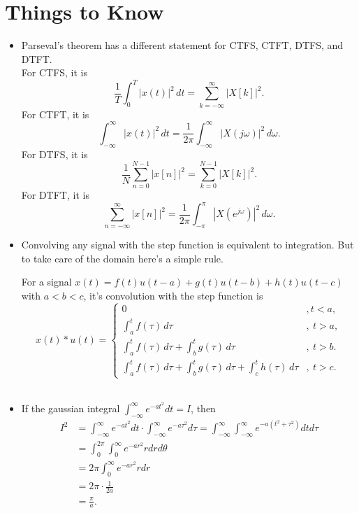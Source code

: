 \documentclass[a4paper]{article}
\begin{document}
\section*{Things to Know}

\begin{itemize}
\item Parseval's theorem has a different statement for CTFS, CTFT, DTFS, and DTFT.\\
For CTFS, it is
\begin{equation*}
    \frac{1}{T} \int_{0}^{T} |x(t)|^2\,dt = \sum_{k=-\infty}^{\infty} |X[k]|^2.
\end{equation*}
For CTFT, it is
\begin{equation*}
    \int_{-\infty}^{\infty} |x(t)|^2\,dt = \frac{1}{2\pi} \int_{-\infty}^{\infty} |X(j\omega)|^2\,d\omega.
\end{equation*}
For DTFS, it is
\begin{equation*}
    \frac{1}{N} \sum_{n=0}^{N-1} |x[n]|^2 = \sum_{k=0}^{N-1} |X[k]|^2.
\end{equation*}
For DTFT, it is
\begin{equation*}
    \sum_{n=-\infty}^{\infty} |x[n]|^2 = \frac{1}{2\pi} \int_{-\pi}^{\pi} |X(e^{j\omega})|^2\,d\omega.
\end{equation*}

\item Convolving any signal with the step function is equivalent to integration. But to take care of the domain here's a simple rule.
\vspace{5pt}

\noindent
For a signal $x(t) = f(t)u(t-a) + g(t)u(t-b) + h(t)u(t-c)$ with $a < b < c$, it's convolution with the step function is
\begin{equation*}
    x(t) * u(t) = 
    \begin{cases}
        0 &, t < a, \\[5pt]
        \int_{a}^{t} f(\tau)\,d\tau &,\ t > a, \\[5pt]
        \int_{a}^{t} f(\tau)\,d\tau + \int_{b}^{t} g(\tau)\,d\tau &,\ t > b. \\[5pt]
        \int_{a}^{t} f(\tau)\,d\tau + \int_{b}^{t} g(\tau)\,d\tau + \int_{c}^{t} h(\tau)\,d\tau &,\ t > c.
    \end{cases}
\end{equation*} \\

\item If the gaussian integral $\int_{-\infty}^{\infty} e^{-at^2} dt = I$, then
\begin{align*}
    I^2 &= \int_{-\infty}^{\infty} e^{-at^2} dt \cdot \int_{-\infty}^{\infty} e^{-a\tau^2} d\tau = \int_{-\infty}^{\infty} \int_{-\infty}^{\infty} e^{-a(t^2 + \tau^2)} dt d\tau \\[5pt]
    &= \int_{0}^{2\pi} \int_{0}^{\infty} e^{-ar^2} r dr d\theta \\[5pt]
    &= 2\pi \int_{0}^{\infty} e^{-ar^2} r dr \\[5pt]
    &= 2\pi \cdot \frac{1}{2a} \\
    &= \frac{\pi}{a}.
\end{align*}


\end{itemize}
\end{document}
